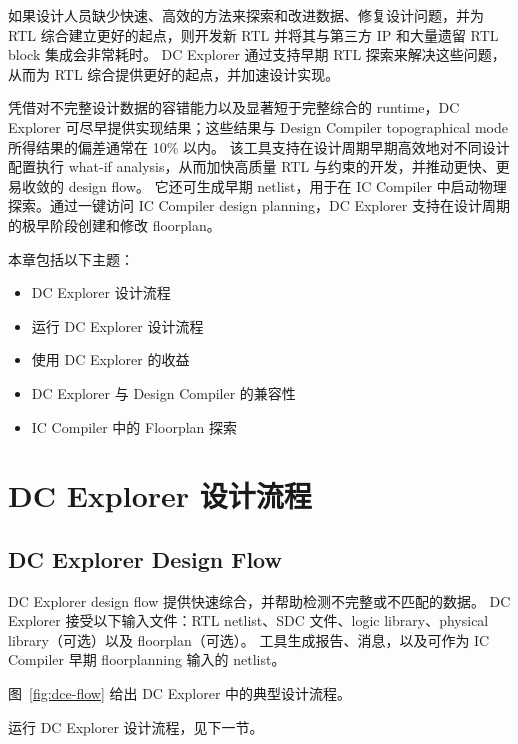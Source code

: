 \label{chap:about}

如果设计人员缺少快速、高效的方法来探索和改进数据、修复设计问题，并为 RTL 综合建立更好的起点，则开发新 RTL 并将其与第三方 IP 和大量遗留 RTL block 集成会非常耗时。
DC Explorer 通过支持早期 RTL 探索来解决这些问题，从而为 RTL 综合提供更好的起点，并加速设计实现。

凭借对不完整设计数据的容错能力以及显著短于完整综合的 runtime，DC Explorer 可尽早提供实现结果；这些结果与 Design Compiler topographical mode 所得结果的偏差通常在 10\% 以内。
该工具支持在设计周期早期高效地对不同设计配置执行 what-if analysis，从而加快高质量 RTL 与约束的开发，并推动更快、更易收敛的 design flow。
它还可生成早期 netlist，用于在 IC Compiler 中启动物理探索。通过一键访问 IC Compiler design planning，DC Explorer 支持在设计周期的极早阶段创建和修改 floorplan。

本章包括以下主题：
\begin{itemize}
  \item DC Explorer 设计流程
  \item 运行 DC Explorer 设计流程
  \item 使用 DC Explorer 的收益
  \item DC Explorer 与 Design Compiler 的兼容性
  \item IC Compiler 中的 Floorplan 探索
\end{itemize}

\section{DC Explorer 设计流程}
\subsection*{DC Explorer Design Flow}

DC Explorer design flow 提供快速综合，并帮助检测不完整或不匹配的数据。
DC Explorer 接受以下输入文件：RTL netlist、SDC 文件、logic library、physical library（可选）以及 floorplan（可选）。
工具生成报告、消息，以及可作为 IC Compiler 早期 floorplanning 输入的 netlist。

图~\ref{fig:dce-flow} 给出 DC Explorer 中的典型设计流程。


\begin{seeAlsoBox}
运行 DC Explorer 设计流程，见下一节。
\end{seeAlsoBox}


